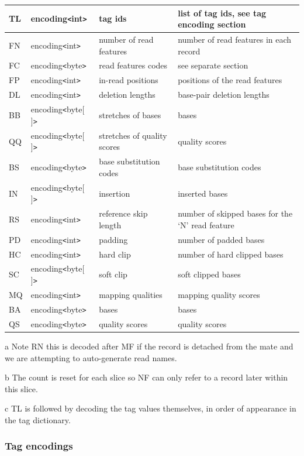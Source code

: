 \documentclass[a4paper]{article}
\begin{document}
\begin{threeparttable}[t]
\begin{tabular}{|l|l|>{\raggedright}p{100pt}|>{\raggedright}p{220pt}|}
\hline
TL\tnote{c} & encoding\texttt{<}int\texttt{>} & tag ids  & list of tag ids, see tag encoding
section\tabularnewline
\hline
FN & encoding\texttt{<}int\texttt{>} & number of read features & number of read
features in each record\tabularnewline
\hline
FC & encoding\texttt{<}byte\texttt{>} & read features codes & see separate section\tabularnewline
\hline
FP & encoding\texttt{<}int\texttt{>} & in-read positions & positions of the read
features\tabularnewline
\hline
DL & encoding\texttt{<}int\texttt{>} & deletion lengths & base-pair deletion lengths\tabularnewline
\hline
BB & encoding\texttt{<}byte[ ]\texttt{>} & stretches of bases & bases\tabularnewline
\hline
QQ & encoding\texttt{<}byte[ ]\texttt{>} & stretches of quality scores & quality scores\tabularnewline
\hline
BS & encoding\texttt{<}byte\texttt{>} & base substitution codes & base substitution
codes\tabularnewline
\hline
IN & encoding\texttt{<}byte[ ]\texttt{>} & insertion & inserted bases\tabularnewline
\hline
RS & encoding\texttt{<}int\texttt{>} & reference skip length & number of skipped 
bases for the `N' read feature\tabularnewline
\hline
PD & encoding\texttt{<}int\texttt{>} & padding & number of padded bases\tabularnewline
\hline
HC & encoding\texttt{<}int\texttt{>} & hard clip & number of hard clipped bases\tabularnewline
\hline
SC & encoding\texttt{<}byte[ ]\texttt{>} & soft clip & soft clipped bases\tabularnewline
\hline
MQ & encoding\texttt{<}int\texttt{>} & mapping qualities & mapping quality scores\tabularnewline
\hline
BA & encoding\texttt{<}byte\texttt{>} & bases & bases\tabularnewline
\hline
QS & encoding\texttt{<}byte\texttt{>} & quality scores & quality scores\tabularnewline
\hline
\end{tabular}

\begin{tablenotes}
\item[a] Note RN this is decoded after MF if the record is detached from the mate and we are attempting to auto-generate read names.
\item[b] The count is reset for each slice so NF can only refer to a record later within this slice.
\item[c] TL is followed by decoding the tag values themselves, in order of appearance in the tag dictionary.
\end{tablenotes}
\end{threeparttable}

\subsubsection*{Tag encodings}
\label{subsubsec:tags}
\end{document}
